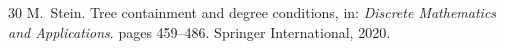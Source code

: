 \documentclass[12pt]{article}
\begin{document}
\begin{thebibliography}{30}
M.~Stein.
\newblock Tree containment and degree conditions, in: {\it Discrete Mathematics
  and Applications}.
\newblock pages 459--486. Springer International, 2020.

%

%



\end{thebibliography}

 
\end{document}

